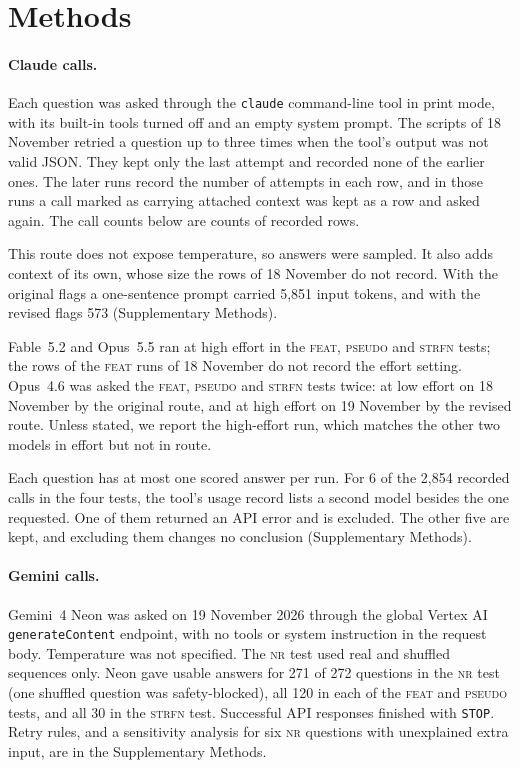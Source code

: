\documentclass[11pt]{article}
\newcommand{\tnr}{\textmd{\textsc{nr}}}\newcommand{\tfeat}{\textmd{\textsc{feat}}}
\newcommand{\tpseudo}{\textmd{\textsc{pseudo}}}\newcommand{\tstrfn}{\textmd{\textsc{strfn}}}
\begin{document}
\FloatBarrier
\section{Methods}\label{sec:methods}

\paragraph{Claude calls.} Each question was asked through the \texttt{claude} command-line tool in print
mode, with its built-in tools turned off and an empty system prompt. The scripts of 18 November retried a
question up to three times when the tool's output was not valid JSON. They kept only the last attempt and
recorded none of the earlier ones. The later runs record the number of attempts in each row, and in those
runs a call marked as carrying attached context was kept as a row and asked again. The call counts below
are counts of recorded rows.

This route does not expose temperature, so answers were sampled. It also adds context of its own, whose
size the rows of 18 November do not record. With the original flags a one-sentence prompt carried 5,851 input tokens, and with the revised flags 573 (Supplementary Methods).

Fable~5.2 and Opus~5.5 ran at high effort in the \tfeat, \tpseudo{} and \tstrfn{} tests; the rows of the \tfeat{} runs of 18 November do
not record the effort setting. Opus~4.6 was asked the \tfeat, \tpseudo{} and \tstrfn{} tests twice: at low effort on 18 November by the
original route, and at high effort on 19 November by the revised route. Unless stated, we report the
high-effort run, which matches the other two models in effort but not in route.

Each question has at most one scored answer per run. For 6 of the 2,854 recorded calls in the four tests,
the tool's usage record lists a second model besides the one requested. One of them returned an API
error and is excluded. The other five are kept, and excluding them changes no conclusion (Supplementary
Methods).

\paragraph{Gemini calls.} Gemini~4 Neon was asked on 19 November 2026 through
the global Vertex AI \texttt{generateContent} endpoint, with no tools or system instruction in the request
body. Temperature was not specified.
The \tnr{} test used real and shuffled sequences only. Neon gave usable answers for 271 of 272 questions in the \tnr{} test
(one shuffled question was safety-blocked), all 120 in each of the \tfeat{} and \tpseudo{} tests, and all 30 in the \tstrfn{} test. Successful
API responses finished with \texttt{STOP}. Retry rules, and a sensitivity analysis for six \tnr{} questions with
unexplained extra input, are in the Supplementary Methods.
\end{document}
